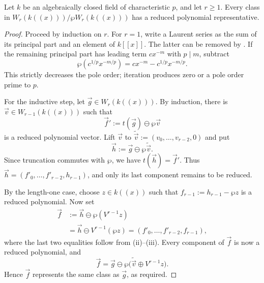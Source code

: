 \begin{prop}
\label{prop:reduced_polynomial_representatives}
Let $k$ be an algebraically closed field of characteristic $p$, and let $r\geq1$.
Every class in $W_r(k((x)))/\wp W_r(k((x)))$ has a reduced polynomial
representative.
\end{prop}

\begin{proof}
Proceed by induction on $r$. For $r=1$, write a Laurent series as the sum of
its principal part and an element of $k[[x]]$. The latter can be removed by
. If the remaining principal part
has leading term $cx^{-m}$ with $p\mid m$, subtract
\[
\wp(c^{1/p}x^{-m/p})=cx^{-m}-c^{1/p}x^{-m/p}.
\]
This strictly decreases the pole order; iteration produces zero or a pole
order prime to $p$.

For the inductive step, let $\vec g\in W_r(k((x)))$. By induction, there is
$\vec v\in W_{r-1}(k((x)))$ such that
\[
\vec f':=t(\vec g)\ominus\wp\vec v
\]
is a reduced polynomial vector. Lift $\vec v$ to
$\widetilde{\vec v}:=(v_0,\dots,v_{r-2},0)$ and put
\[
\vec h:=\vec g\ominus\wp\widetilde{\vec v}.
\]
Since truncation commutes with $\wp$, we have $t(\vec h)=\vec f'$.
Thus $\vec h=(f'_0,\dots,f'_{r-2},h_{r-1})$, and only its last
component remains to be reduced.

By the length-one case, choose $z\in k((x))$ such that
$f_{r-1}:=h_{r-1}-\wp z$ is a reduced polynomial. Now set
\[
\begin{aligned}
\vec f
&:=\vec h\ominus\wp(V^{r-1}z)\\
&=\vec h\ominus V^{r-1}(\wp z)
 =(f'_0,\dots,f'_{r-2},f_{r-1}),
\end{aligned}
\]
where the last two equalities follow from
(ii)--(iii). Every component of $\vec f$
is now a reduced polynomial, and
\[
\vec f=\vec g\ominus
\wp\bigl(\widetilde{\vec v}\oplus V^{r-1}z\bigr).
\]
Hence $\vec f$ represents the same class as $\vec g$, as required.
\end{proof}
